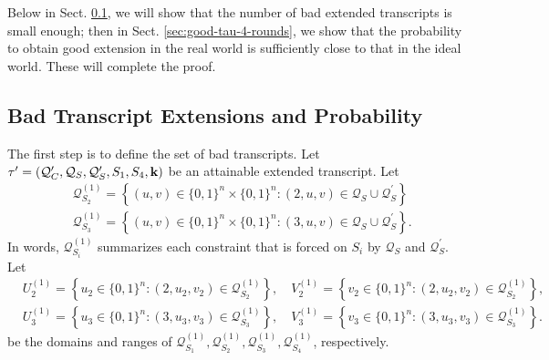 Below in Sect. \ref{sec:bad-tau-4-rounds}, we will show that the number of bad extended transcripts is small enough; then in Sect. \ref{sec:good-tau-4-rounds}, we show that the probability to obtain good extension in the real world is sufficiently close to that in the ideal world. These will complete the proof.




\subsection{Bad Transcript Extensions and Probability}
\label{sec:bad-tau-4-rounds}

The first step is to define the set of bad transcripts. Let $\tau'=(\mathcal{Q}_{C}',\mathcal{Q}_{S},\mathcal{Q}_{S}',S_1,S_4,\mathbf{k})$ be an attainable extended transcript. Let
%
$$
\begin{aligned}
&\mathcal{Q}_{S_2}^{(1)}=\left\{(u, v) \in\{0,1\}^{n} \times\{0,1\}^{n}:(2, u, v) \in \mathcal{Q}_{S} \cup \mathcal{Q}_{S}^{\prime}\right\}\\
&\mathcal{Q}_{S_3}^{(1)}=\left\{(u, v) \in\{0,1\}^{n} \times\{0,1\}^{n}:(3, u, v) \in \mathcal{Q}_{S} \cup \mathcal{Q}_{S}^{\prime}\right\}.
\end{aligned}
$$
%
In words, $\mathcal{Q}_{S_{i}}^{(1)}$ summarizes each constraint that is forced on $S_{i}$ by $\mathcal{Q}_{S}$ and $\mathcal{Q}_{S}^{\prime}$. Let        {\small
%
$$
\begin{aligned}
&U_2^{(1)}=\left\{u_2 \in\{0,1\}^{n}:\left(2, u_2, v_2\right) \in \mathcal{Q}_{S_2}^{(1)}\right\}, \quad V_2^{(1)}=\left\{v_2 \in\{0,1\}^{n}:\left(2, u_2, v_2\right) \in \mathcal{Q}_{S_2}^{(1)}\right\},\\
&U_3^{(1)}=\left\{u_3 \in\{0,1\}^{n}:\left(3, u_3, v_3\right) \in \mathcal{Q}_{S_3}^{(1)}\right\}, \quad V_3^{(1)}=\left\{v_3 \in\{0,1\}^{n}:\left(3, u_3, v_3\right) \in \mathcal{Q}_{S_3}^{(1)}\right\}.
\end{aligned}
$$
}%
%
be the domains and ranges of $\mathcal{Q}_{S_{1}}^{(1)},\mathcal{Q}_{S_2}^{(1)},\mathcal{Q}_{S_3}^{(1)},\mathcal{Q}_{S_{4}}^{(1)}$, respectively.




